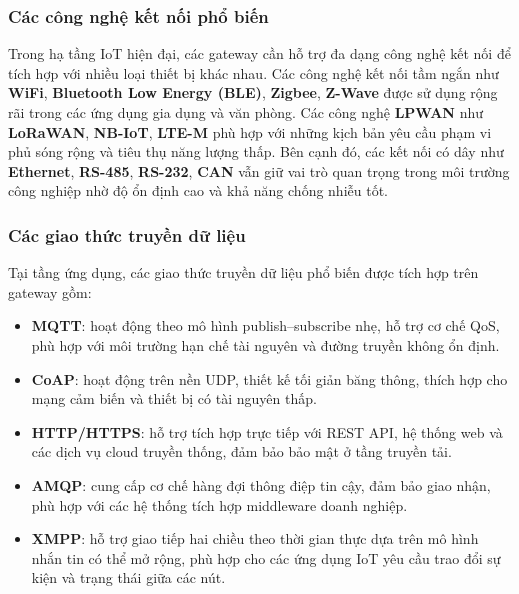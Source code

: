         \subsubsection{Các công nghệ kết nối phổ biến}
            Trong hạ tầng IoT hiện đại, các gateway cần hỗ trợ đa dạng công nghệ kết nối để tích hợp với nhiều loại thiết bị khác nhau. Các công nghệ kết nối tầm ngắn như \textbf{WiFi}, \textbf{Bluetooth Low Energy (BLE)}, \textbf{Zigbee}, \textbf{Z-Wave} được sử dụng rộng rãi trong các ứng dụng gia dụng và văn phòng. Các công nghệ \textbf{LPWAN} như \textbf{LoRaWAN}, \textbf{NB-IoT}, \textbf{LTE-M} phù hợp với những kịch bản yêu cầu phạm vi phủ sóng rộng và tiêu thụ năng lượng thấp. Bên cạnh đó, các kết nối có dây như \textbf{Ethernet}, \textbf{RS-485}, \textbf{RS-232}, \textbf{CAN} vẫn giữ vai trò quan trọng trong môi trường công nghiệp nhờ độ ổn định cao và khả năng chống nhiễu tốt.

        \subsubsection{Các giao thức truyền dữ liệu}
            Tại tầng ứng dụng, các giao thức truyền dữ liệu phổ biến được tích hợp trên gateway gồm:
            \begin{itemize}
                \item \textbf{MQTT}: hoạt động theo mô hình publish--subscribe nhẹ, hỗ trợ cơ chế QoS, phù hợp với môi trường hạn chế tài nguyên và đường truyền không ổn định.
                \item \textbf{CoAP}: hoạt động trên nền UDP, thiết kế tối giản băng thông, thích hợp cho mạng cảm biến và thiết bị có tài nguyên thấp.
                \item \textbf{HTTP/HTTPS}: hỗ trợ tích hợp trực tiếp với REST API, hệ thống web và các dịch vụ cloud truyền thống, đảm bảo bảo mật ở tầng truyền tải.
                \item \textbf{AMQP}: cung cấp cơ chế hàng đợi thông điệp tin cậy, đảm bảo giao nhận, phù hợp với các hệ thống tích hợp middleware doanh nghiệp.
                \item \textbf{XMPP}: hỗ trợ giao tiếp hai chiều theo thời gian thực dựa trên mô hình nhắn tin có thể mở rộng, phù hợp cho các ứng dụng IoT yêu cầu trao đổi sự kiện và trạng thái giữa các nút.
            \end{itemize}

